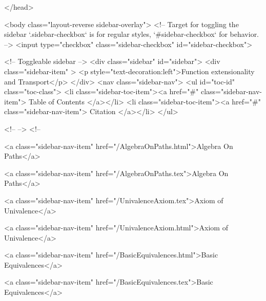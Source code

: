  
</head>




  <body class="layout-reverse sidebar-overlay">
    <!-- Target for toggling the sidebar `.sidebar-checkbox` is for regular
     styles, `#sidebar-checkbox` for behavior. -->
<input type="checkbox" class="sidebar-checkbox" id="sidebar-checkbox">

<!-- Toggleable sidebar -->
<div class="sidebar" id="sidebar">
  <div class="sidebar-item" >
    <p style="text-decoration:left">Function extensionality and Transport</p>
  </div>
  <nav class="sidebar-nav">
    <ul id="toc-id" class="toc-class">
  <li class="sidebar-toc-item"><a href="#" class="sidebar-nav-item"> Table of Contents </a></li>
  <li class="sidebar-toc-item"><a href="#" class="sidebar-nav-item"> Citation </a></li>
</ul>


    <!--  -->
    <!-- 
      
    
      
    
      
    
      
    
      
        
      
    
      
        
          <a class="sidebar-nav-item" href="/AlgebraOnPaths.html">Algebra On Paths</a>
        
      
    
      
        
          <a class="sidebar-nav-item" href="/AlgebraOnPaths.tex">Algebra On Paths</a>
        
      
    
      
        
          <a class="sidebar-nav-item" href="/UnivalenceAxiom.tex">Axiom of Univalence</a>
        
      
    
      
        
          <a class="sidebar-nav-item" href="/UnivalenceAxiom.html">Axiom of Univalence</a>
        
      
    
      
        
          <a class="sidebar-nav-item" href="/BasicEquivalences.html">Basic Equivalences</a>
        
      
    
      
        
          <a class="sidebar-nav-item" href="/BasicEquivalences.tex">Basic Equivalences</a>
        
